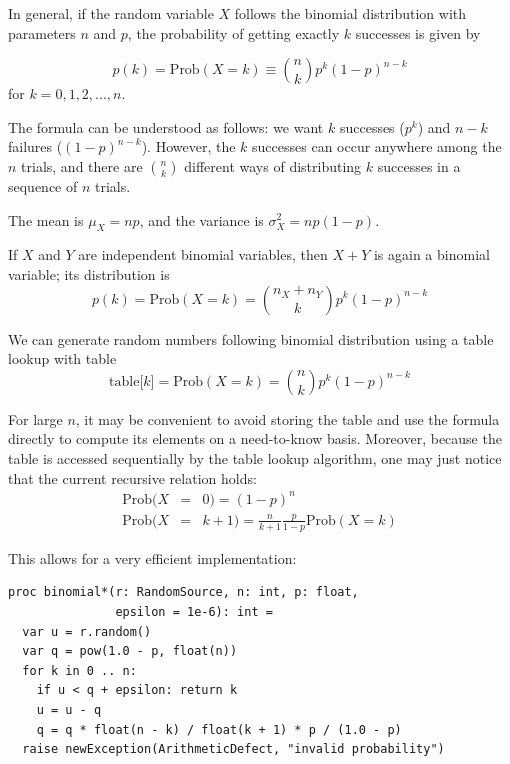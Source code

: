 \documentclass[justified, sixbynine]{tufte-book}
\def\ft{\small\tt}
\theoremstyle{plain}%
\newtheorem * {corollary}{Corollary}
\theoremstyle{definition}
\theoremstyle{remark}
\newtheorem * {remark}{Remark}
\newtheorem * {note}{Note}
\begin{document}
\begin{fullwidth}
In general, if the random variable $X$ follows the binomial distribution with
parameters $n$ and $p$, the probability of getting exactly $k$ successes is
given by

\begin{equation}
p(k)=\textrm{Prob}(X=k) \equiv  \binom nkp^k(1-p)^{n-k}
\end{equation}
for $k=0, 1, 2, ..., n$.

The formula can be understood as follows: we want $k$ successes ($p^k$) and $%
n-k$ failures ($(1-p)^{n-k}$). However, the $k$ successes can occur anywhere
among the $n$ trials, and there are $\binom nk$ different ways of distributing
$k$ successes in a sequence of $n$ trials.

The mean is $\mu _X=np$, and the variance is $\sigma _X^2=np(1-p)$.

If $X$ and $Y$ are independent binomial variables, then $X+Y$ is again a
binomial variable; its distribution is
\begin{equation}
p(k)=\textrm{Prob}(X=k)=\binom{n_X+n_Y}kp^k(1-p)^{n-k}
\end{equation}

We can generate random numbers following binomial distribution using a table lookup with table
\begin{equation}
\text{table[}k\text{]}=\textrm{Prob}(X=k)=\binom nkp^k(1-p)^{n-k}
\end{equation}

For large $n$, it may be convenient to avoid storing the table and use the
formula directly to compute its elements on a need-to-know basis.
Moreover, because the table is accessed sequentially by the
table lookup algorithm, one may just notice that the current recursive relation holds:
\begin{eqnarray}
\textrm{Prob}(X &=&0)=(1-p)^n \\
\textrm{Prob}(X &=&k+1)=\frac n{k+1}\frac p{1-p}\textrm{Prob}(X=k)
\end{eqnarray}

This allows for a very efficient implementation:

\begin{lstlisting}[caption={in file: {\ft nlib.nim}}]
proc binomial*(r: RandomSource, n: int, p: float,
               epsilon = 1e-6): int =
  var u = r.random()
  var q = pow(1.0 - p, float(n))
  for k in 0 .. n:
    if u < q + epsilon: return k
    u = u - q
    q = q * float(n - k) / float(k + 1) * p / (1.0 - p)
  raise newException(ArithmeticDefect, "invalid probability")
\end{lstlisting}



\end{fullwidth}
\end{document}
